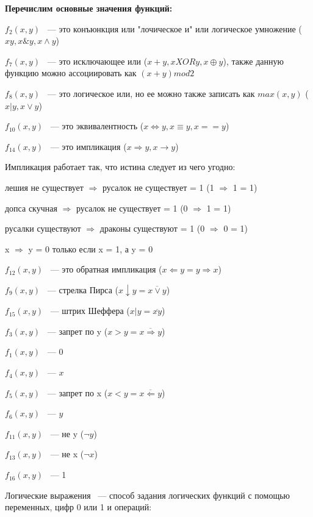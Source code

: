 \documentclass[russian]{lecture-notes}
\begin{document}
\begin{sloppypar}
\begin{example}
	\textbf{Перечислим основные значения функций:}
	
	$f_2(x,y)$ ~--- это конъюнкция или "лочическое и"  или логическое умножение ($xy, x\&y, x \wedge y$)
	
	$f_7(x,y)$ ~--- это исключающее или ($x+y, x XOR y, x \oplus y$), также данную функцию можно ассоциировать как $(x+y) mod 2$
	
	$f_8(x,y)$ ~--- это логическое или, но ее можно также записать как $max(x,y)$  ($x|y, x \lor y$)
	
	$f_{10}(x,y)$ ~--- это эквивалентность ($x \Leftrightarrow y, x \equiv y, x == y$)
	
	$f_{14}(x,y)$ ~--- это импликация ($x \Rightarrow y, x \rightarrow y$)
	
	Импликация работает так, что истина следует из чего угодно:
	
	лешия не существует $\Rightarrow$ русалок не существует = 1 (1 $\Rightarrow$ 1 = 1)
	
	допса скучная $\Rightarrow$ русалок не существует = 1 (0 $\Rightarrow$ 1 = 1)
	
	русалки существуют $\Rightarrow$ драконы существуют = 1 (0 $\Rightarrow$ 0 = 1)	

	 x $\Rightarrow$ y = 0 только если x = 1, а y = 0

	$f_{12}(x,y)$ ~--- это обратная импликация ($x \Leftarrow y = y \Rightarrow x$)
	
	$f_{9}(x,y)$ ~--- стрелка Пирса ($x \downarrow y = \overline{x \lor y}$)

	$f_{15}(x,y)$ ~--- штрих Шеффера ($x | y = \overline{xy}$)
	
	$f_{3}(x,y)$ ~--- запрет по y ($x > y = \overline{x \Rightarrow y}$)

	$f_{1}(x,y)$ ~--- 0

	$f_{4}(x,y)$ ~--- $x$
	
	$f_{5}(x,y)$ ~--- запрет по x ($x < y = \overline{x \Leftarrow y}$)

	$f_{6}(x,y)$ ~--- $y$
	
	$f_{11}(x,y)$ ~--- не y ($\neg y$)
	
	$f_{13}(x,y)$ ~--- не x ($\neg x$)
	
	$f_{16}(x,y)$ ~--- 1

\end{example}

\begin{definition} 
	Логические выражения ~--- способ задания логических функций с помощью переменных, цифр 0 или 1 и операций:
	

\end{definition}
\end{sloppypar}
\end{document}
